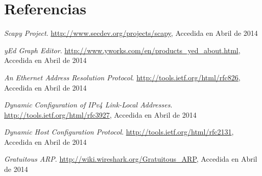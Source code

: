 \documentclass[a4paper, 10pt, twoside]{article}
\begin{document}
\section{Referencias}


\begin{thebibliography}{9}

	\emph{Scapy Project}.
	\url{http://www.secdev.org/projects/scapy}, 
	Accedida en Abril de 2014

	\emph{yEd Graph Editor}.
	\url{http://www.yworks.com/en/products_yed_about.html}, 
	Accedida en Abril de 2014

	\emph{An Ethernet Address Resolution Protocol}.
	\url{http://tools.ietf.org/html/rfc826}, 
	Accedida en Abril de 2014
	
	\emph{Dynamic Configuration of IPv4 Link-Local Addresses}.
	\url{http://tools.ietf.org/html/rfc3927}, 
	Accedida en Abril de 2014
	
	\emph{Dynamic Host Configuration Protocol}.
	\url{http://tools.ietf.org/html/rfc2131}, 
	Accedida en Abril de 2014

	\emph{Gratuitous ARP}.
	\url{http://wiki.wireshark.org/Gratuitous_ARP}, 
	Accedida en Abril de 2014

\end{thebibliography}
\end{document}

